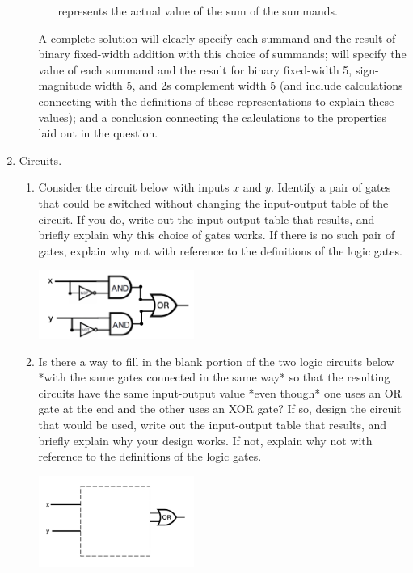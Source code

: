 \begin{enumerate}[labelindent=0pt, leftmargin=0pt]
\begin{enumerate}
\begin{itemize}
            represents the actual value of the sum of the summands.
            \end{itemize}
            A complete solution will clearly specify each summand and the result of binary fixed-width addition 
            with this choice of summands; will specify  the value of each summand and the result for 
            binary fixed-width 5, 
            sign-magnitude width 5, and 2s complement width 5 (and include calculations connecting with the 
            definitions of these representations to explain these values); and a conclusion connecting
            the calculations to the properties laid out in the question.
        \end{enumerate}    
        \item Circuits. 
        \begin{enumerate}
            \item\gradeComplete Consider the circuit below with inputs $x$ and $y$. 
            Identify a pair of gates that could 
            be switched without changing the input-output table of the circuit.
            If you do, write 
            out the input-output table that results, and briefly explain why 
            this choice of gates works. If there is no such pair of gates, 
            explain why not with reference to the definitions
            of the logic gates.            
        \begin{center}
            \includegraphics[width=2in]{../../files/circuits-hw3.png}
        \end{center}

        \item\gradeCorrect  Is there a way to fill in the blank portion of 
        the two logic circuits below *with the same gates connected in the same way*
        so that the resulting circuits have the same 
        input-output value *even though* one uses an OR gate at the end and the other 
        uses an XOR gate? If so, design the circuit that would be used, write 
        out the input-output table that results, and briefly explain why your 
        design works. If not, explain why not with reference to the definitions
        of the logic gates.
        \begin{multicols}{2}
            \begin{center}
                \includegraphics[width=2in]{../../files/circuit-blank-or-hw3.png}
            \end{center}
     

\end{multicols}
\end{enumerate}
\end{enumerate}
